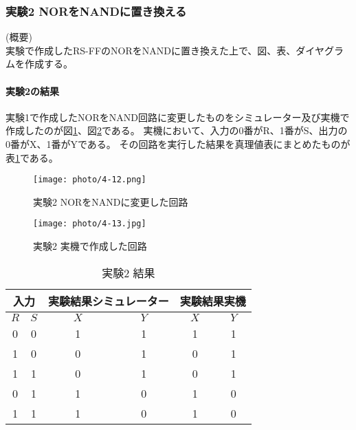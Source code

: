 \documentclass[dvipdfmx]{jsarticle}
\begin{document}
\subsubsection{実験2 NORをNANDに置き換える}
(概要)\\
実験で作成したRS-FFのNORをNANDに置き換えた上で、図、表、ダイヤグラムを作成する。

\paragraph{実験2の結果}

実験1で作成したNORをNAND回路に変更したものをシミュレーター及び実機で作成したのが図\ref{fig:4-12}、図\ref{fig:4-13}である。
実機において、入力の0番がR、1番がS、出力の0番がX、1番がYである。
その回路を実行した結果を真理値表にまとめたものが表\ref{tb:4-7}である。\\

\begin{figure}[hbtp]
  \begin{center}
    \texttt{[image: photo/4-12.png]}
  \end{center}
  \caption{実験2 NORをNANDに変更した回路}
  \label{fig:4-12}
\end{figure}

\begin{figure}
  \begin{center}
    \texttt{[image: photo/4-13.jpg]}
  \end{center}
  \caption{実験2 実機で作成した回路}
  \label{fig:4-13}
\end{figure}

\begin{table}[hbtp]
  \caption{実験2 結果}
  \centering
  \begin{tabular}{|c|c||c|c||c|c|} \hline
    \multicolumn{2}{|c||}{入力} & \multicolumn{2}{c||}{実験結果シミュレーター} & \multicolumn{2}{c|}{実験結果実機} \\ \hline
    $R$ & $S$ & $X$ & $Y$ & $X$ & $Y$ \\ \hline
    0 & 0 & 1 & 1 & 1 & 1 \\ \hline
    1 & 0 & 0 & 1 & 0 & 1 \\ \hline
    1 & 1 & 0 & 1 & 0 & 1 \\ \hline
    0 & 1 & 1 & 0 & 1 & 0 \\ \hline
    1 & 1 & 1 & 0 & 1 & 0 \\ \hline
  \end{tabular}
  \label{tb:4-7}
\end{table}
\end{document}

